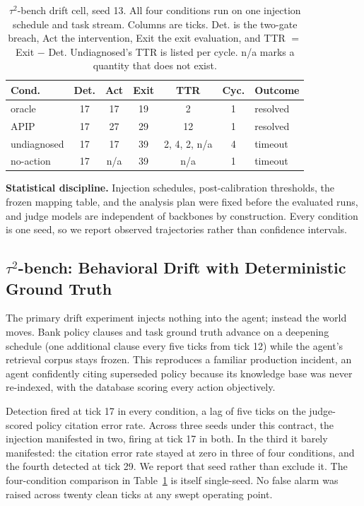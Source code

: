 \documentclass[conference]{IEEEtran}
\begin{document}
\begin{table}[!t]
\caption{$\tau^2$-bench drift cell, seed 13. All four conditions run on one injection schedule and task stream. Columns are ticks. Det. is the two-gate breach, Act the intervention, Exit the exit evaluation, and TTR $=$ Exit $-$ Det. Undiagnosed's TTR is listed per cycle. n/a marks a quantity that does not exist.}
\label{tab:drift}
\centering
\footnotesize
\begin{tabular}{lcccccl}
\hline
Cond. & Det. & Act & Exit & TTR & Cyc. & Outcome \\
\hline
oracle & 17 & 17 & 19 & 2 & 1 & resolved \\
APIP & 17 & 27 & 29 & 12 & 1 & resolved \\
undiagnosed & 17 & 17 & 39 & 2, 4, 2, n/a & 4 & timeout \\
no-action & 17 & n/a & 39 & n/a & 1 & timeout \\
\hline
\end{tabular}
\end{table}

\textbf{Statistical discipline.} Injection schedules, post-calibration thresholds, the frozen mapping table, and the analysis plan were fixed before the evaluated runs, and judge models are independent of backbones by construction. Every condition is one seed, so we report observed trajectories rather than confidence intervals.

\subsection{$\tau^2$-bench: Behavioral Drift with Deterministic Ground Truth}

The primary drift experiment injects nothing into the agent; instead the world moves. Bank policy clauses and task ground truth advance on a deepening schedule (one additional clause every five ticks from tick 12) while the agent's retrieval corpus stays frozen. This reproduces a familiar production incident, an agent confidently citing superseded policy because its knowledge base was never re-indexed, with the database scoring every action objectively.

Detection fired at tick 17 in every condition, a lag of five ticks on the judge-scored policy citation error rate. Across three seeds under this contract, the injection manifested in two, firing at tick 17 in both. In the third it barely manifested: the citation error rate stayed at zero in three of four conditions, and the fourth detected at tick 29. We report that seed rather than exclude it. The four-condition comparison in Table~\ref{tab:drift} is itself single-seed. No false alarm was raised across twenty clean ticks at any swept operating point.
\end{document}
